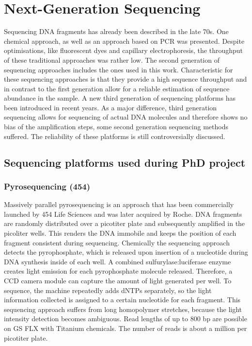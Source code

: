 \section{Next-Generation Sequencing}
Sequencing DNA fragments has already been described in the late 70s.
One chemical approach, as well as an approach based on PCR was presented.
Despite optimisations, like fluorescent dyes and capillary electrophoresis, the throughput of these traditional approaches was rather low.
The second generation of sequencing approaches includes the ones used in this work.
Characteristic for these sequencing approaches is that they provide a high sequence throughput and in contrast to the first generation allow for a reliable estimation of sequence abundance in the sample.
A new third generation of sequencing platforms has been introduced in recent years.
As a major difference, third generation sequencing allows for sequencing of actual DNA molecules and therefore shows no bias of the amplification steps, some second generation sequencing methods suffered.
The reliability of these platforms is still controversially discussed.

\subsection{Sequencing platforms used during PhD project}
\subsubsection{Pyrosequencing (454)}
Massively parallel pyrosequencing is an approach that has been commercially launched by 454 Life Sciences and was later acquired by Roche.
DNA fragments are randomly distributed over a picotiter plate and subsequently amplified in the picoliter wells.
This renders the DNA immobile and keeps the position of each fragment consistent during sequencing.
Chemically the sequencing approach detects the pyrophosphate, which is released upon insertion of a nucleotide during DNA synthesis inside of each well.
A combined sulfurylase:luciferase enzyme creates light emission for each pyrophosphate molecule released.
Therefore, a CCD camera module can capture the amount of light generated per well.
To sequence, the machine repeatedly adds dNTPs separately, so the light information collected is assigned to a certain nucleotide for each fragment.
This sequencing approach suffers from long homopolymer stretches, because the light intensity detection becomes ambiguous.
Read lengths of up to 800 bp are possible on GS FLX with Titanium chemicals.
The number of reads is about a million per picotiter plate.

